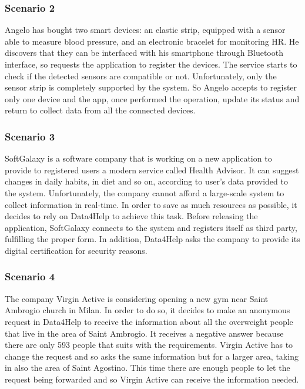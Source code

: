 {\color{Blue}\subsubsection{Scenario 2}}

Angelo has bought two smart devices: an elastic strip, equipped with a sensor able to measure blood pressure, and an electronic bracelet for monitoring HR. He discovers that they can be interfaced with his smartphone through Bluetooth interface, so requests the application to register the devices. The service starts to check if the detected sensors are compatible or not. Unfortunately, only the sensor strip is completely supported by the system. So Angelo accepts to register only one device and the app, once performed the operation, update its status and return to collect data from all the connected devices.


{\color{Blue}\subsubsection{Scenario 3}}

SoftGalaxy is a software company that is working on a new application to provide to registered users a modern service called Health Advisor. It can suggest changes in daily habits, in diet and so on, according to user's data provided to the system. Unfortunately, the company cannot afford a large-scale system to collect information in real-time. In order to save as much resources as possible, it decides to rely on Data4Help to achieve this task. Before releasing the application, SoftGalaxy connects to the system and registers itself as third party, fulfilling the proper form. In addition, Data4Help asks the company to provide its digital certification for security reasons.


{\color{Blue}\subsubsection{Scenario 4}}
The company Virgin Active is considering opening a new gym near Saint Ambrogio church in Milan. In order to do so, it decides to make an anonymous request in Data4Help to receive the information about all the overweight people that live in the area of Saint Ambrogio. It receives a negative answer because there are only 593 people that suits with the requirements. Virgin Active has to change the request and so asks the same information but for a larger area, taking in also the area of Saint Agostino. This time there are enough people to let the request being forwarded and so Virgin Active can receive the information needed.


